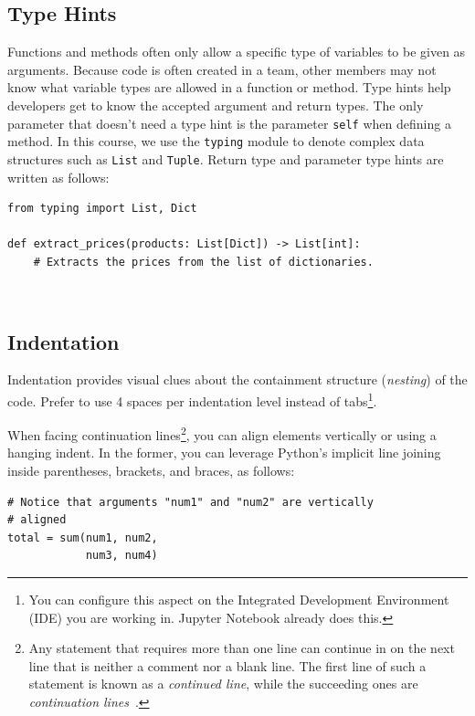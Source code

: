 \documentclass{tufte-handout}
\begin{document}
\subsection{Type Hints}
Functions and methods often only allow a specific type of variables to be given as arguments.
Because code is often created in a team, other members may not know what variable types are allowed in a function or method.
Type hints help developers get to know the accepted argument and return types.
The only parameter that doesn't need a type hint is the parameter \texttt{self} when defining a method.
In this course, we use the \texttt{typing} module to denote complex data structures such as \texttt{List} and \texttt{Tuple}.
Return type and parameter type hints are written as follows:

\begin{mdframed}
\begin{verbatim}
from typing import List, Dict

def extract_prices(products: List[Dict]) -> List[int]:
    # Extracts the prices from the list of dictionaries.
\end{verbatim}
\end{mdframed}

\


\subsection{Indentation}

Indentation provides visual clues about the containment structure (\emph{nesting\/}) of the code.
Prefer to use 4 spaces per indentation level instead of tabs\footnote{You can configure this aspect on the Integrated Development Environment (IDE) you are working in. Jupyter Notebook already does this.}.

When facing continuation lines\footnote{Any statement that requires more than one line can continue in on the next line that is neither a comment nor a blank line. The first line of such a statement is known as a \emph{continued line}, while the succeeding ones are \emph{continuation lines}~\cite{ibm2022continuation}.}, you can align elements vertically or using a hanging indent.
In the former, you can leverage Python's implicit line joining inside parentheses, brackets, and braces, as follows:


\begin{mdframed}
\begin{verbatim}
# Notice that arguments "num1" and "num2" are vertically 
# aligned
total = sum(num1, num2,
            num3, num4)
\end{verbatim}
\end{mdframed}
\end{document}
